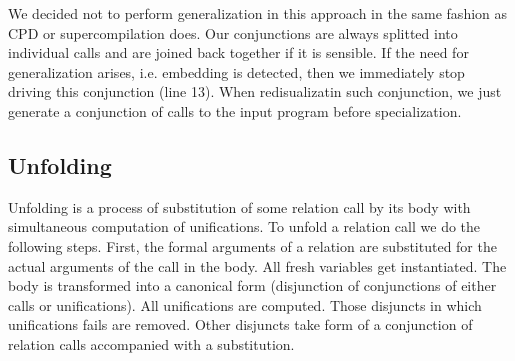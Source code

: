 We decided not to perform generalization in this approach in the same fashion as CPD or supercompilation does.
Our conjunctions are always splitted into individual calls and are joined back together if it is sensible.
If the need for generalization arises, i.e. embedding is detected, then we immediately stop driving this conjunction (line 13).
When redisualizatin such conjunction, we just generate a conjunction of calls to the input program before specialization.




\subsection{Unfolding}

Unfolding is a process of substitution of some relation call by its body with simultaneous computation of unifications.
To unfold a relation call we do the following steps.
First, the formal arguments of a relation are substituted for the actual arguments of the call in the body.
All fresh variables get instantiated.
The body is transformed into a canonical form (disjunction of conjunctions of either calls or unifications).
All unifications are computed.
Those disjuncts in which unifications fails are removed.
Other disjuncts take form of a conjunction of relation calls accompanied with a substitution.

